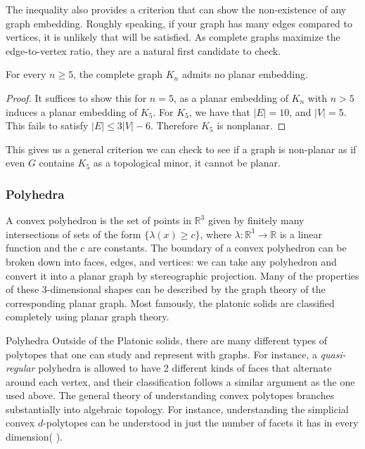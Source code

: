 The inequality also provides a criterion that can show the non-existence of any graph embedding. Roughly speaking, if your graph has many edges compared to vertices, it is unlikely that  will be satisfied. As complete graphs maximize the edge-to-vertex ratio, they are a natural first candidate to check. 

\begin{corollary}
 For every $n\geq 5$, the complete graph $K_n$ admits no planar embedding. 
\end{corollary}

\begin{proof}
 It suffices to show this for $n=5$, as a planar embedding of $K_n$ with $n>5$ induces a planar embedding of $K_5$.  For $K_5$, we have that $|E|=10$, and $|V|=5$. This fails to satisfy $|E|\leq 3|V|-6$. Therefore $K_5$ is nonplanar. 
\end{proof}
This gives us a general criterion we can check to see if a graph is non-planar as if even $G$ contains $K_5$ as a topological minor, it cannot be planar. 
\subsubsection{Polyhedra}
A convex polyhedron is the set of points in $\mathbb{R}^3$ given by finitely many intersections of sets of the form $\{\lambda(x)\geq c\}$, where $\lambda: \mathbb{R}^3\to \mathbb{R}$ is a linear function and the $c$ are constants. The boundary of a convex polyhedron can be broken down into faces, edges, and vertices: we can take any polyhedron and convert it into a planar graph by stereographic projection. Many of the properties of these 3-dimensional shapes can be described by the graph theory of the corresponding planar graph. Most famously, the platonic solids  are classified completely using planar graph theory.

\begin{projectdescription}{Polyhedra}
  Outside of the Platonic solids, there are many different types of polytopes that one can study and represent with graphs. For instance, a \emph{quasi-regular} polyhedra is allowed to have 2 different kinds of faces that alternate \label{proj:polytope} around each vertex, and their classification follows a similar argument as the one used above. The general theory of understanding convex polytopes branches substantially into algebraic topology. For instance, understanding the simplicial convex $d$-polytopes can be understood in just the number of facets it has in every dimension( \cite{stanley1980number}). 
\end{projectdescription}


